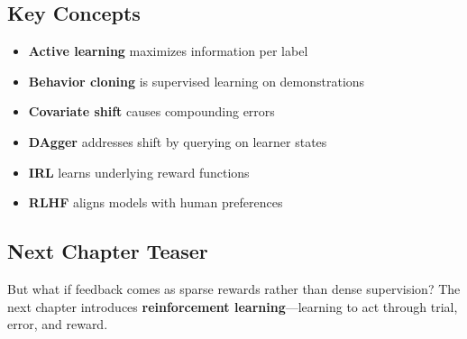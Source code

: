 \subsection{Key Concepts}
\begin{itemize}
    \item \textbf{Active learning} maximizes information per label
    \item \textbf{Behavior cloning} is supervised learning on demonstrations
    \item \textbf{Covariate shift} causes compounding errors
    \item \textbf{DAgger} addresses shift by querying on learner states
    \item \textbf{IRL} learns underlying reward functions
    \item \textbf{RLHF} aligns models with human preferences
\end{itemize}

\subsection{Next Chapter Teaser}
 But what if feedback comes as sparse rewards rather than dense supervision? The next chapter introduces \textbf{reinforcement learning}---learning to act through trial, error, and reward.
